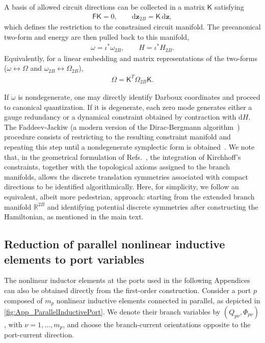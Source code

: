\documentclass[prx,aps,twocolumn,article]{revtex4-2}
\newcommand{\msf}[1]{\mathsf{#1}}
\newcommand{\bsb}[1]{\boldsymbol{#1}}
\newcommand{\msF}{\msf{F}}
\newcommand{\msK}{\msf{K}}
\newcommand{\msOmega}{\msf{\Omega}}
\begin{document}
A basis of allowed circuit directions can be collected in a matrix
$\msK$ satisfying
\begin{align}
    \msF\msK=0,
    \qquad
    \mathrm{d}\bsb{z}_{2B}
    =
    \msK\,\mathrm{d}\bsb{z},
    \label{Eq:AppConstraintKernel}
\end{align}
which defines the restriction to the constrained circuit manifold.
The precanonical two-form and energy are then pulled back to this
manifold,
\begin{align}
    \omega
    =
    \iota^*\omega_{2B},
    \qquad
    H
    =
    \iota^*H_{2B}.
    \label{Eq:AppPullback}
\end{align}
Equivalently, for a linear embedding and matrix representations of the two-forms ($\omega \leftrightarrow\msOmega$ and $\omega_{2B}\leftrightarrow\msOmega_{2B}$),
\begin{align}
   \msOmega
    =
    \msK^T
    \msOmega_{2B}
    \msK.
    \label{Eq:AppTwoFormPullback}
\end{align}

If $\omega$ is nondegenerate, one may directly identify Darboux
coordinates and proceed to canonical quantization. If it is
degenerate, each zero mode generates either a gauge redundancy or a dynamical constraint obtained by contraction with $\mathrm{d}H$. The Faddeev-Jackiw (a modern version of the Dirac-Bergmann algorithm~\cite{Dirac:1950,Bergmann:1949}) procedure consists of restricting to the resulting constraint manifold and repeating this step until a nondegenerate symplectic form is obtained~\cite{Faddeev:1988,Jackiw:1993,
ParraRodriguez:2024,Osborne:2024,ParraRodriguez:2025}. We note that, in the geometrical formulation of Refs.~\cite{ParraRodriguez:2024,ParraRodriguez:2025}, the integration of Kirchhoff's constraints, together with the topological axioms assigned to the branch manifolds, allows the discrete translation symmetries associated with compact directions to be identified algorithmically. Here, for simplicity, we follow an equivalent, albeit more pedestrian, approach: starting from the extended branch manifold $\mathbb{R}^{2B}$ and identifying potential discrete symmetries after constructing the Hamiltonian, as mentioned in the main text.

\subsection*{Reduction of parallel nonlinear inductive elements to port variables}
\label{AppSubsec:ParallelNonlinearInductors}
The nonlinear inductor elements at the ports used in the following Appendices can
also be obtained directly from the first-order construction. Consider
a port $p$ composed of $m_p$ nonlinear inductive elements connected
in parallel, as depicted in \cref{fig:App_ParallelInductivePort}.
We denote their branch variables by
$(Q_{p\nu},\Phi_{p\nu})$, with
$\nu=1,\ldots,m_p$, and choose the branch-current orientations
opposite to the port-current direction.
\end{document}
